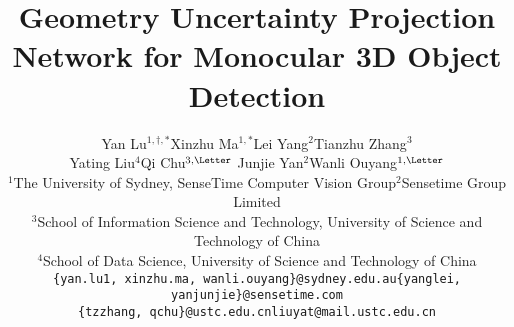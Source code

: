 \documentclass[10pt,twocolumn,letterpaper]{article}
\begin{document}
\title{Geometry Uncertainty Projection Network for Monocular 3D Object Detection}
\begin{small}
\author{Yan Lu$^{1,\dagger,*}$\quad Xinzhu Ma$^{1,*}$\quad Lei Yang$^2$\quad Tianzhu Zhang$^3$\\ Yating Liu$^4$\quad Qi Chu$^{3,\text{\Letter}}$\quad 
Junjie Yan$^2$\quad Wanli Ouyang$^{1,\text{\Letter}}$\\
$^1$The University of Sydney, SenseTime Computer Vision Group\quad $^2$Sensetime Group Limited\\
$^3$School of Information Science and Technology, University of Science and Technology of China\\
$^4$School of Data Science, University of Science and Technology of China\\
{\tt\small \{yan.lu1, xinzhu.ma, wanli.ouyang\}@sydney.edu.au\quad \{yanglei, yanjunjie\}@sensetime.com}\\
{\tt\small \{tzzhang, qchu\}@ustc.edu.cn\quad liuyat@mail.ustc.edu.cn}
}
\end{small}
\maketitle
\renewcommand{\thefootnote}{$\dagger$}
\renewcommand{\thefootnote}{*}
\renewcommand{\thefootnote}{\Letter}
\renewcommand{\thefootnote}{}
\renewcommand{\thefootnote}{1}
\end{document}
